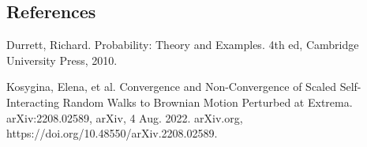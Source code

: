 \subsection{References}

Durrett, Richard. Probability: Theory and Examples. 4th ed, Cambridge University Press, 2010.

Kosygina, Elena, et al. Convergence and Non-Convergence of Scaled Self-Interacting Random Walks to Brownian Motion Perturbed at Extrema. arXiv:2208.02589, arXiv, 4 Aug. 2022. arXiv.org, https://doi.org/10.48550/arXiv.2208.02589.

